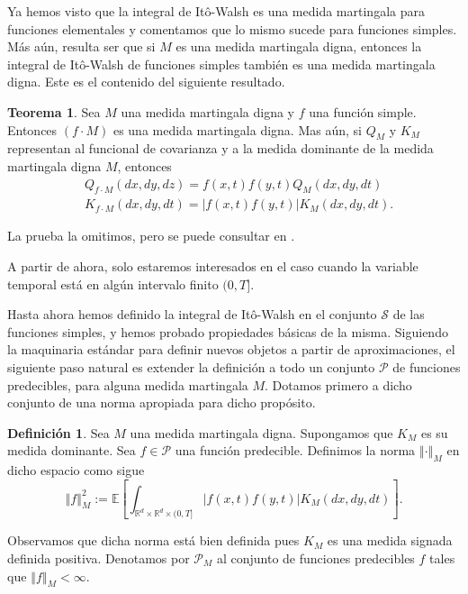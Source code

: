 \documentclass[letterpaper,twoside,12pt]{book}
\newcommand{\R}{\mathbb{R}}
\newcommand{\E}{\mathbb{E}}
\newcommand{\1}{\mathds{1}}
\newcommand{\abs}[1]{\left\lvert #1 \right\rvert}
\newcommand{\norm}[1]{\left\Vert #1 \right\Vert}
\theoremstyle{definition}
\newtheorem{dfn}{Definición}
\theoremstyle{definition}
\newtheorem{teo}{Teorema}
\theoremstyle{remark}
\theoremstyle{definition}
\theoremstyle{definition}
\theoremstyle{definition}
\theoremstyle{definition}
\theoremstyle{definition}
\begin{document}
Ya hemos visto que la integral de Itô-Walsh es una medida martingala para funciones elementales y comentamos que lo mismo sucede para funciones simples. Más aún, resulta ser que si $M$ es una medida martingala digna, entonces la integral de Itô-Walsh de funciones simples también es una medida martingala digna. Este es el contenido del siguiente resultado.

\begin{teo}\label{propiedadesintegralwalsh}
Sea $M$ una medida martingala digna y $f$ una función simple. Entonces $(f\cdot M)$ es una medida martingala digna. 
Mas aún, si $Q_M$ y $K_M$ representan al funcional de covarianza y a la medida dominante de la medida martingala digna $M$, entonces 
\begin{align*}
   &Q_{f\cdot M}(dx,  dy,  dz)=f(x,t)f(y,t)Q_M(dx,  dy,  dt)\\
   &K_{f\cdot M}(dx, dy,  dt)=\abs{f(x,t)f(y,t)}K_M(dx,  dy,  dt). 
\end{align*}
\end{teo}
La prueba la omitimos, pero se puede consultar en \cite[proposición 5.23]{Khoshnevisan2009}.

A partir de ahora, solo estaremos interesados en el caso cuando la variable temporal está en algún intervalo finito $(0,T]$.

Hasta ahora hemos definido la integral de Itô-Walsh en el conjunto $\mathscr{S}$ de las funciones simples, y hemos probado propiedades básicas de la misma. Siguiendo la maquinaria estándar para definir nuevos objetos a partir de aproximaciones, el siguiente paso natural es extender la definición a todo un conjunto $\mathscr{P}$ de funciones predecibles, para alguna medida martingala $M$. Dotamos primero a dicho conjunto de una norma apropiada para dicho propósito.
\begin{dfn} 
Sea $M$ una medida martingala digna. Supongamos que $K_M$ es su medida dominante. Sea $f\in \mathscr{P}$ una función predecible. Definimos la norma $\norm{\cdot}_M$ en dicho espacio como sigue 
\[
   \norm{f}_M^2:=\E\left[\int_{\R^{d}\times\R^{d}\times (0,T]} \abs{f(x,t)f(y,t)}K_M(dx, dy, dt)\right].
\]
\end{dfn}
Observamos que dicha norma está bien definida pues $K_M$ es una medida signada definida positiva. Denotamos por $\mathscr{P}_M$ al conjunto de funciones predecibles $f$ tales que $\norm{f}_M<\infty$.
\end{document}
